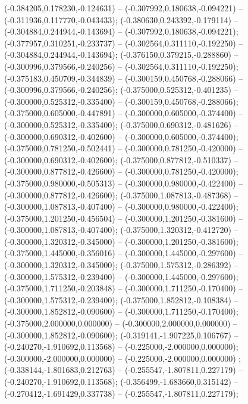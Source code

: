  (-0.384205,0.178230,-0.124631) -- (-0.307992,0.180638,-0.094221) -- (-0.311936,0.117770,-0.043433);
 (-0.380630,0.243392,-0.179114) -- (-0.304884,0.244944,-0.143694) -- (-0.307992,0.180638,-0.094221);
 (-0.377957,0.310251,-0.233737) -- (-0.302564,0.311110,-0.192250) -- (-0.304884,0.244944,-0.143694);
 (-0.376150,0.379215,-0.288860) -- (-0.300996,0.379566,-0.240256) -- (-0.302564,0.311110,-0.192250);
 (-0.375183,0.450709,-0.344839) -- (-0.300159,0.450768,-0.288066) -- (-0.300996,0.379566,-0.240256);
 (-0.375000,0.525312,-0.401235) -- (-0.300000,0.525312,-0.335400) -- (-0.300159,0.450768,-0.288066);
 (-0.375000,0.605000,-0.447891) -- (-0.300000,0.605000,-0.374400) -- (-0.300000,0.525312,-0.335400);
 (-0.375000,0.690312,-0.481626) -- (-0.300000,0.690312,-0.402600) -- (-0.300000,0.605000,-0.374400);
 (-0.375000,0.781250,-0.502441) -- (-0.300000,0.781250,-0.420000) -- (-0.300000,0.690312,-0.402600);
 (-0.375000,0.877812,-0.510337) -- (-0.300000,0.877812,-0.426600) -- (-0.300000,0.781250,-0.420000);
 (-0.375000,0.980000,-0.505313) -- (-0.300000,0.980000,-0.422400) -- (-0.300000,0.877812,-0.426600);
 (-0.375000,1.087813,-0.487368) -- (-0.300000,1.087813,-0.407400) -- (-0.300000,0.980000,-0.422400);
 (-0.375000,1.201250,-0.456504) -- (-0.300000,1.201250,-0.381600) -- (-0.300000,1.087813,-0.407400);
 (-0.375000,1.320312,-0.412720) -- (-0.300000,1.320312,-0.345000) -- (-0.300000,1.201250,-0.381600);
 (-0.375000,1.445000,-0.356016) -- (-0.300000,1.445000,-0.297600) -- (-0.300000,1.320312,-0.345000);
 (-0.375000,1.575312,-0.286392) -- (-0.300000,1.575312,-0.239400) -- (-0.300000,1.445000,-0.297600);
 (-0.375000,1.711250,-0.203848) -- (-0.300000,1.711250,-0.170400) -- (-0.300000,1.575312,-0.239400);
 (-0.375000,1.852812,-0.108384) -- (-0.300000,1.852812,-0.090600) -- (-0.300000,1.711250,-0.170400);
 (-0.375000,2.000000,0.000000) -- (-0.300000,2.000000,0.000000) -- (-0.300000,1.852812,-0.090600);
 (-0.319141,-1.907225,0.106767) -- (-0.240270,-1.910692,0.113568) -- (-0.225000,-2.000000,0.000000);
 (-0.300000,-2.000000,0.000000) -- (-0.225000,-2.000000,0.000000) ;
 (-0.338144,-1.801683,0.212763) -- (-0.255547,-1.807811,0.227179) -- (-0.240270,-1.910692,0.113568);
 (-0.356499,-1.683660,0.315142) -- (-0.270412,-1.691429,0.337738) -- (-0.255547,-1.807811,0.227179);
